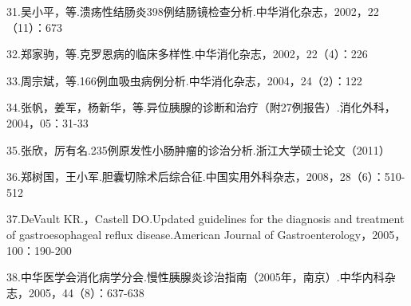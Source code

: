 31.吴小平，等.溃疡性结肠炎398例结肠镜检查分析.中华消化杂志，2002，22（11）：673

32.郑家驹，等.克罗恩病的临床多样性.中华消化杂志，2002，22（4）：226

33.周宗斌，等.166例血吸虫病例分析.中华消化杂志，2004，24（2）：122

34.张帆，姜军，杨新华，等.异位胰腺的诊断和治疗（附27例报告）.消化外科，2004，05：31-33

35.张欣，厉有名.235例原发性小肠肿瘤的诊治分析.浙江大学硕士论文（2011）

36.郑树国，王小军.胆囊切除术后综合征.中国实用外科杂志，2008，28（6）：510-512

37.DeVault KR.，Castell DO.Updated guidelines for the diagnosis and
treatment of gastroesophageal reflux disease.American Journal of
Gastroenterology，2005，100：190-200

38.中华医学会消化病学分会.慢性胰腺炎诊治指南（2005年，南京）.中华内科杂志，2005，44（8）：637-638

\protect\hypertarget{text00212.html}{}{}

